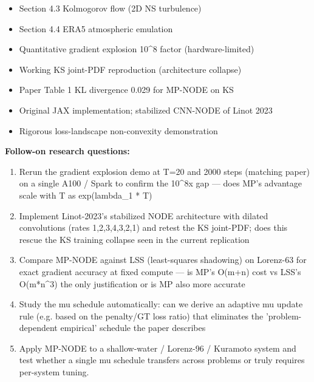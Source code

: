 \documentclass[11pt]{article}
\begin{document}
\begin{itemize}[leftmargin=1.4em,itemsep=0.2em,topsep=0.2em]
\item Section 4.3 Kolmogorov flow (2D NS turbulence)
\item Section 4.4 ERA5 atmospheric emulation
\item Quantitative gradient explosion 10\textasciicircum{}8 factor (hardware-limited)
\item Working KS joint-PDF reproduction (architecture collapse)
\item Paper Table 1 KL divergence 0.029 for MP-NODE on KS
\item Original JAX implementation; stabilized CNN-NODE of Linot 2023
\item Rigorous loss-landscape non-convexity demonstration
\end{itemize}\noindent\textbf{Follow-on research questions:}
\begin{enumerate}[leftmargin=1.6em,itemsep=0.2em,topsep=0.2em,label=Q\arabic*.]
\item Rerun the gradient explosion demo at T=20 and 2000 steps (matching paper) on a single A100 / Spark to confirm the 10\textasciicircum{}8x gap --- does MP's advantage scale with T as exp(lambda\_1 * T)
\item Implement Linot-2023's stabilized NODE architecture with dilated convolutions (rates 1,2,3,4,3,2,1) and retest the KS joint-PDF; does this rescue the KS training collapse seen in the current replication
\item Compare MP-NODE against LSS (least-squares shadowing) on Lorenz-63 for exact gradient accuracy at fixed compute --- is MP's O(m+n) cost vs LSS's O(m*n\textasciicircum{}3) the only justification or is MP also more accurate
\item Study the mu schedule automatically: can we derive an adaptive mu update rule (e.g. based on the penalty/GT loss ratio) that eliminates the 'problem-dependent empirical' schedule the paper describes
\item Apply MP-NODE to a shallow-water / Lorenz-96 / Kuramoto system and test whether a single mu schedule transfers across problems or truly requires per-system tuning.
\end{enumerate}
\end{document}
